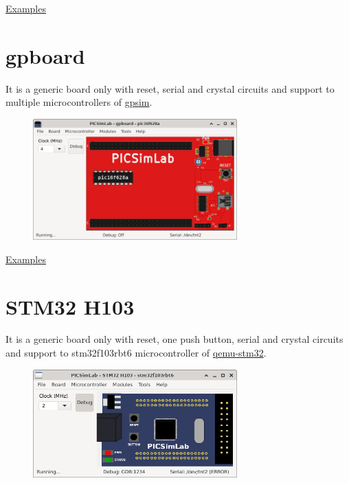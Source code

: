\href{https://lcgamboa.github.io/picsimlab_examples/examples/examples_index_exp.html\#board_uCboard}{Examples}

\section{gpboard}

It is a generic board only with reset, serial and crystal circuits and support to multiple microcontrollers 
of \href{http://gpsim.sourceforge.net/}{gpsim}.

\begin{figure}[H]
\center
\includegraphics[width=0.7\textwidth]{img/gpboard.png} 
\end{figure} 

\href{https://lcgamboa.github.io/picsimlab_examples/examples/examples_index_exp.html\#board_gpboard}{Examples}


\section{STM32 H103}

It is a generic board only with reset, one push button, serial and crystal circuits and support to stm32f103rbt6 microcontroller of 
\href{https://beckus.github.io/qemu_stm32/}{qemu-stm32}.

\begin{figure}[H]
\center
\includegraphics[width=0.7\textwidth]{img/STM32_H103.png} 
\end{figure} 

